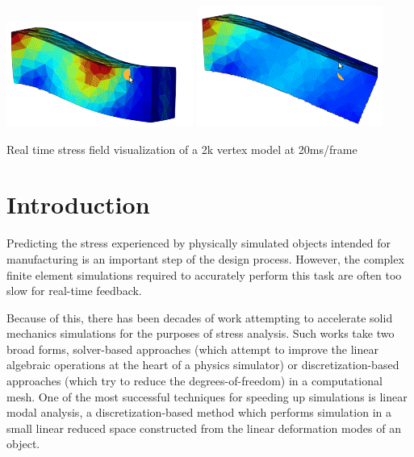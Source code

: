\documentclass[sigconf, authorversion, review]{acmart}
\begin{document}
%
%


\begin{teaserfigure}
  \centering
  \includegraphics[width=.3\textwidth]{figures/teaser}\hspace{2cm}
    \includegraphics[width=.3\textwidth]{figures/teaser2}
  \caption{Real time stress field visualization of a 2k vertex model at 20ms/frame\label{fig:teaser}}
\end{teaserfigure}

\maketitle

\section{Introduction}\label{sec:intro}
Predicting the stress experienced by physically simulated objects intended for manufacturing is an important step of the design process. However, the complex finite element simulations required to accurately perform this task are often too slow for real-time feedback.

Because of this, there has been decades of work attempting to accelerate solid mechanics simulations for the purposes of stress analysis. Such works take two broad forms, solver-based approaches (which attempt to improve the linear algebraic operations at the heart of a physics simulator) or discretization-based approaches (which try to reduce the degrees-of-freedom) in a computational mesh. One of the most successful techniques for speeding up simulations is linear modal analysis, a discretization-based method which performs simulation in a small linear reduced space constructed from the linear deformation modes of an object. 
\end{document}
